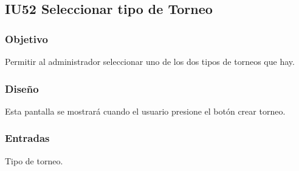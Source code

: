 
\subsection{IU52 Seleccionar tipo de Torneo}

\subsubsection{Objetivo}
	Permitir al administrador seleccionar uno de los dos tipos de torneos que hay.

\subsubsection{Diseño}
	Esta pantalla se mostrará cuando el usuario presione el botón crear torneo.



\subsubsection{Entradas}
	Tipo de torneo.
